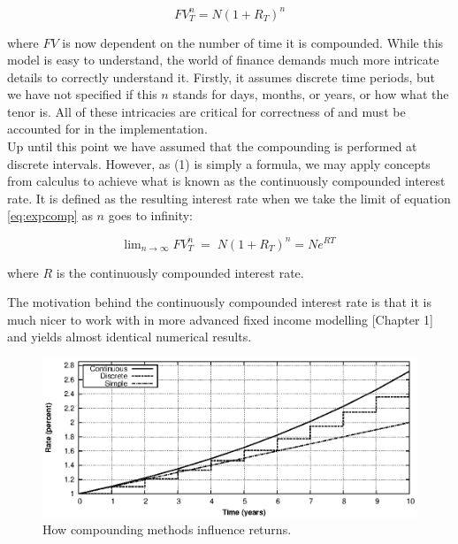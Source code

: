 \begin{equation}\label{eq:expcomp}
FV_T^n = N (1 + R_T)^n
\end{equation}

where $FV$ is now dependent on the number of time it is compounded.
While this model is easy to understand, the world of finance demands much more 
intricate details to correctly understand it. Firstly, it assumes 
discrete time periods, but we have not specified if this $n$ stands for days, 
months, or years, or how what the tenor is. All of these intricacies are critical
for correctness of \hql and must be accounted for in the implementation.\\

Up until this point we have assumed that the compounding is performed at 
discrete intervals. However, as (1) is simply a formula, we may apply concepts 
from calculus to achieve what is known as the continuously compounded interest 
rate. It is defined as the resulting interest rate when we take the limit of 
equation \ref{eq:expcomp} as $n$ goes to infinity:

\begin{equation}
\text{lim}_{n \rightarrow \infty}\; FV_T^n \; = \; N (1 + R_T)^n
= N e^{RT}
\end{equation}

where $R$ is the continuously compounded interest rate.

The motivation behind the continuously compounded interest rate is that it is
much nicer to work with in more advanced fixed income modelling
\cite{cmunk}[Chapter 1] and yields almost identical numerical results.\\

\begin{figure}[!htb]
\centering
\includegraphics[scale=1.2]{images/comp02.eps}
\caption{How compounding methods influence returns.}
\label{fig:comp02}
\end{figure}

